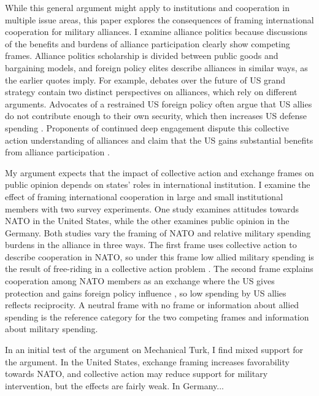 \documentclass[12pt]{article}
\begin{document}
While this general argument might apply to institutions and cooperation in multiple issue areas, this paper explores the consequences of framing international cooperation for military alliances. 
I examine alliance politics because discussions of the benefits and burdens of alliance participation clearly show competing frames. 
Alliance politics scholarship is divided between public goods and bargaining models, and foreign policy elites describe alliances in similar ways, as the earlier quotes imply. 
For example, debates over the future of US grand strategy contain two distinct perspectives on alliances, which rely on different arguments. 
Advocates of a restrained US foreign policy often argue that US allies do not contribute enough to their own security, which then increases US defense spending \citep{Preble2009, Posen2014}.
Proponents of continued deep engagement dispute this collective action understanding of alliances and claim that the US gains substantial benefits from alliance participation \citep{BrooksWohlforth2008, BrandsFeaver2017}. 


My argument expects that the impact of collective action and exchange frames on public opinion depends on states' roles in international institution. 
I examine the effect of framing international cooperation in large and small institutional members with two survey experiments. 
One study examines attitudes towards NATO in the United States, while the other examines public opinion in the Germany. 
Both studies vary the framing of NATO and relative military spending burdens in the alliance in three ways. 
The first frame uses collective action to describe cooperation in NATO, so under this frame low allied military spending is the result of free-riding in a collective action problem \citep{OlsonZeckhauser1966}.
The second frame explains cooperation among NATO members as an exchange where the US gives protection and gains foreign policy influence \citep{Morrow1991}, so low spending by US allies reflects reciprocity. 
A neutral frame with no frame or information about allied spending is the reference category for the two competing frames and information about military spending.


In an initial test of the argument on Mechanical Turk, I find mixed support for the argument.
In the United States, exchange framing increases favorability towards NATO, and collective action may reduce support for military intervention, but the effects are fairly weak. 
In Germany... 
\end{document}
